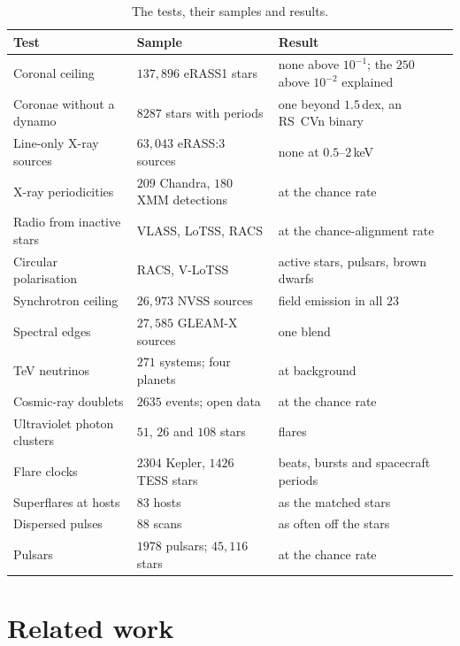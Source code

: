 \documentclass[3p,11pt]{elsarticle}
\begin{document}
\begin{table}[t]
\centering\small
\caption{The tests, their samples and results.}
\label{tab:tests}
\begin{tabular}{>{\raggedright\arraybackslash}p{} >{\raggedright\arraybackslash}p{} >{\raggedright\arraybackslash}p{}}
\toprule
Test & Sample & Result \\
\midrule
Coronal ceiling & $137{,}896$ eRASS1 stars & none above $10^{-1}$; the $250$ above $10^{-2}$ explained \\
Coronae without a dynamo & $8287$ stars with periods & one beyond $1.5$\,dex, an RS~CVn binary \\
Line-only X-ray sources & $63{,}043$ eRASS:3 sources & none at $0.5$--$2$\,keV \\
X-ray periodicities & $209$ Chandra, $180$ XMM detections & at the chance rate \\
Radio from inactive stars & VLASS, LoTSS, RACS & at the chance-alignment rate \\
Circular polarisation & RACS, V-LoTSS & active stars, pulsars, brown dwarfs \\
Synchrotron ceiling & $26{,}973$ NVSS sources & field emission in all $23$ \\
Spectral edges & $27{,}585$ GLEAM-X sources & one blend \\
TeV neutrinos & $271$ systems; four planets & at background \\
Cosmic-ray doublets & $2635$ events; open data & at the chance rate \\
Ultraviolet photon clusters & $51$, $26$ and $108$ stars & flares \\
Flare clocks & $2304$ Kepler, $1426$ TESS stars & beats, bursts and spacecraft periods \\
Superflares at hosts & $83$ hosts & as the matched stars \\
Dispersed pulses & $88$ scans & as often off the stars \\
Pulsars & $1978$ pulsars; $45{,}116$ stars & at the chance rate \\
\bottomrule
\end{tabular}
\end{table}

\section{Related work}\label{sec:related}
\end{document}
